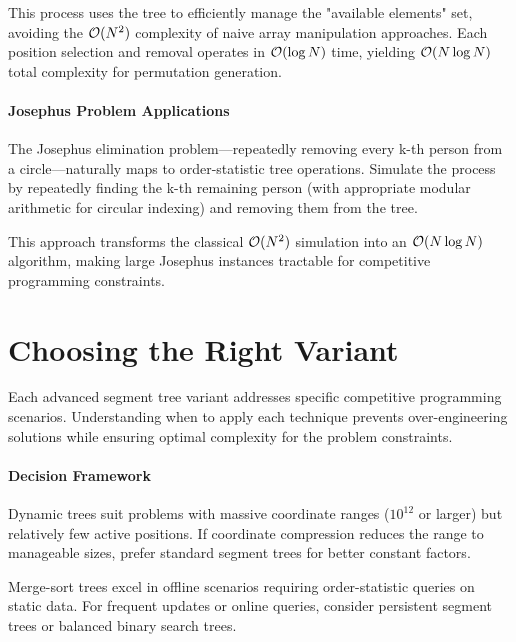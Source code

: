 
This process uses the tree to efficiently manage the "available elements" set, avoiding the $\mathcal{O}(N^2)$ complexity of naive array manipulation approaches. Each position selection and removal operates in $\mathcal{O}(\log N)$ time, yielding $\mathcal{O}(N \log N)$ total complexity for permutation generation.

\paragraph{Josephus Problem Applications}

The Josephus elimination problem—repeatedly removing every k-th person from a circle—naturally maps to order-statistic tree operations. Simulate the process by repeatedly finding the k-th remaining person (with appropriate modular arithmetic for circular indexing) and removing them from the tree.

This approach transforms the classical $\mathcal{O}(N^2)$ simulation into an $\mathcal{O}(N \log N)$ algorithm, making large Josephus instances tractable for competitive programming constraints.

\section{Choosing the Right Variant}
\label{sec:variant_selection}

Each advanced segment tree variant addresses specific competitive programming scenarios. Understanding when to apply each technique prevents over-engineering solutions while ensuring optimal complexity for the problem constraints.

\paragraph{Decision Framework}

Dynamic trees suit problems with massive coordinate ranges ($10^{12}$ or larger) but relatively few active positions. If coordinate compression reduces the range to manageable sizes, prefer standard segment trees for better constant factors.

Merge-sort trees excel in offline scenarios requiring order-statistic queries on static data. For frequent updates or online queries, consider persistent segment trees or balanced binary search trees.

